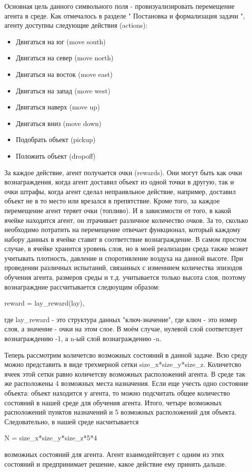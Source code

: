 \documentclass[12pt, a4paper]{report}
\theoremstyle{definition}
\theoremstyle{plain}
\theoremstyle{remark}
\theoremstyle{remark}
\theoremstyle{definition}
\begin{document}
Основная цель данного символьного поля - провизуализировать перемещение агента в среде. Как отмечалось в разделе " Постановка и формализация задачи ", агенту доступны следующие действия (actions):
\begin{itemize}
\item Двигаться на юг (move south)
\item Двигаться на север (move north)
\item Двигаться на восток (move east)
\item Двигаться на запад (move west)
\item Двигаться наверх (move up)
\item Двигаться вниз (move down)
\item Подобрать объект (pickup)
\item Положить объект (dropoff)
 \end{itemize}

За каждое действие, агент получается очки (rewards). Они могут быть как очки вознаграждения, когда агент доставил объект из одной точки в другую, так и очки штрафы, когда агент сделал непраивльное действие, например, доставил объект не в то место или врезался в препятствие. Кроме того, за каждое перемещение агент теряет очки (топливо). И в зависимости от того, в какой ячейке находится агент, он зтрачивает различное количество очков. За то, сколько необходимо потратить на перемещение отвечает функционал, который каждому набору данных в ячейке ставит в соответствие вознаграждение. В самом простом случае, в ячейке хранится уровень слоя, но в моей реализации среда также может учитывать плотность, давление и споротивление воздуха на данной высоте. При проведении различных испытаний, связанных с изменнием количества эпизодов обучения агента, размеров среды и т.д. учитывается только высота слоя, поэтому вознаграждние рассчитывается следюущим образом:
\begin{center}
    reward = lay\_reward(lay),
\end{center}
где lay\_reward - это структура данных "ключ-значение", где ключ - это номер слоя, а значение - очки на этом слое. В моём случае, нулевой слой соответсвует вознаграждению -1, а n-ый слой вознаграждению -n. 

Теперь рассмотрим количетсво возможных состояний в данной задаче. Всю среду можно представить в виде трехмерной сетки size\_x*size\_y*size\_z. Количетсво ячеек этой сетки равно количетсву возможных расположений агента. В среде так же расположены 4 возможных места назначения. Если еще учесть одно состояние объекта: объект находится у агента, то можно подсчитать общее количество состояний в нашей среде для обучения агента. Итого, четыре возможных расположений пунктов назначений и 5 возможных расположений для объекта. Следовательно, в нашей среде насчитывается 
\begin{center}
    N = size\_x*size\_y*size\_z*5*4
\end{center}
возможных состояний для агента. Агент взаимодейтсвует с одним из этих состояний и предпринимает решение, какое действие ему принять дальше.\\
\end{document}
